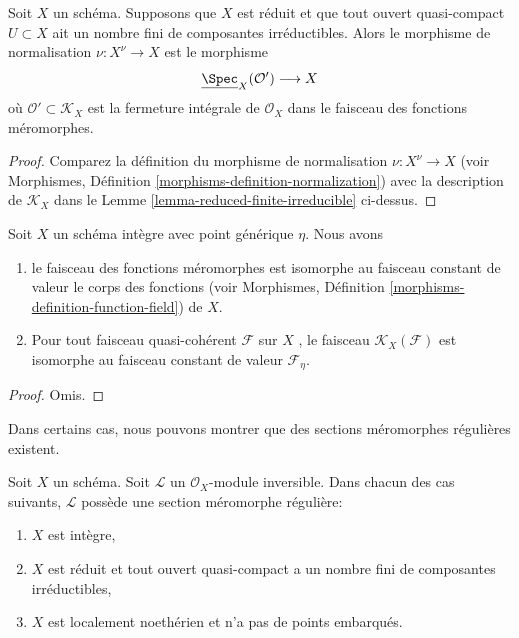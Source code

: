 \begin{lemma}
\label{lemma-reduced-normalization}
Soit  $X$  un schéma. Supposons que  $X$  est réduit et que tout
ouvert quasi-compact  $U \subset X$  ait un nombre fini de composantes irréductibles.
Alors le morphisme de normalisation  $\nu : X^\nu \to X$  est le morphisme
$$
\underline{\Spec}_X(\mathcal{O}') \longrightarrow X
$$
où  $\mathcal{O}' \subset \mathcal{K}_X$  est la fermeture intégrale de  $\mathcal{O}_X$  dans le faisceau des
fonctions méromorphes.
\end{lemma}

\begin{proof}
Comparez la définition du morphisme de normalisation  $\nu : X^\nu \to X$  (voir
Morphismes, Définition  \ref{morphisms-definition-normalization}) avec la description de  $\mathcal{K}_X$  dans le
Lemme  \ref{lemma-reduced-finite-irreducible}  ci-dessus.
\end{proof}

\begin{lemma}
\label{lemma-meromorphic-functions-integral-scheme}
Soit  $X$  un schéma intègre avec point générique  $\eta$. Nous avons
\begin{enumerate}
\item le faisceau des fonctions méromorphes est isomorphe au faisceau constant de valeur
le corps des fonctions (voir Morphismes, Définition  \ref{morphisms-definition-function-field}) de  $X$.
\item Pour tout faisceau quasi-cohérent  $\mathcal{F}$  sur  $X$ , le faisceau
 $\mathcal{K}_X(\mathcal{F})$  est isomorphe au faisceau constant de valeur  $\mathcal{F}_\eta$.
\end{enumerate}
\end{lemma}

\begin{proof}
Omis.
\end{proof}

\noindent
Dans certains cas, nous pouvons montrer que des sections méromorphes régulières
existent.

\begin{lemma}
\label{lemma-regular-meromorphic-section-exists}
Soit  $X$  un schéma. Soit  $\mathcal{L}$  un  $\mathcal{O}_X$-module inversible.
Dans chacun des cas suivants,  $\mathcal{L}$  possède une section méromorphe
régulière:
\begin{enumerate}
\item $X$  est intègre,
\item $X$  est réduit et tout ouvert quasi-compact a un nombre fini de
composantes irréductibles,
\item $X$  est localement noethérien et n’a pas de points embarqués.
\end{enumerate}
\end{lemma}

